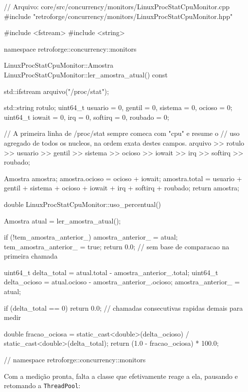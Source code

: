 \begin{CaixaCodigo}
// Arquivo: core/src/concurrency/monitors/LinuxProcStatCpuMonitor.cpp
#include "retroforge/concurrency/monitors/LinuxProcStatCpuMonitor.hpp"

#include <fstream>
#include <string>

namespace retroforge::concurrency::monitors {

LinuxProcStatCpuMonitor::Amostra LinuxProcStatCpuMonitor::ler_amostra_atual() const {
    std::ifstream arquivo("/proc/stat");

    std::string rotulo;
    uint64_t usuario = 0, gentil = 0, sistema = 0, ocioso = 0;
    uint64_t iowait = 0, irq = 0, softirq = 0, roubado = 0;

    // A primeira linha de /proc/stat sempre comeca com "cpu" e resume o
    // uso agregado de todos os nucleos, na ordem exata destes campos.
    arquivo >> rotulo >> usuario >> gentil >> sistema >> ocioso >> iowait >> irq >> softirq >>
        roubado;

    Amostra amostra;
    amostra.ocioso = ocioso + iowait;
    amostra.total = usuario + gentil + sistema + ocioso + iowait + irq + softirq + roubado;
    return amostra;
}

double LinuxProcStatCpuMonitor::uso_percentual() {
    Amostra atual = ler_amostra_atual();

    if (!tem_amostra_anterior_) {
        amostra_anterior_ = atual;
        tem_amostra_anterior_ = true;
        return 0.0; // sem base de comparacao na primeira chamada
    }

    uint64_t delta_total = atual.total - amostra_anterior_.total;
    uint64_t delta_ocioso = atual.ocioso - amostra_anterior_.ocioso;
    amostra_anterior_ = atual;

    if (delta_total == 0) {
        return 0.0; // chamadas consecutivas rapidas demais para medir
    }

    double fracao_ociosa = static_cast<double>(delta_ocioso) / static_cast<double>(delta_total);
    return (1.0 - fracao_ociosa) * 100.0;
}

} // namespace retroforge::concurrency::monitors
\end{CaixaCodigo}

Com a medição pronta, falta a classe que efetivamente reage a ela, pausando e retomando a \texttt{ThreadPool}:

